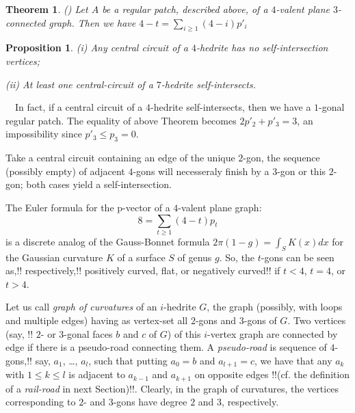 \documentclass[12pt]{article}
\newtheorem{proposition}{Proposition}
\newtheorem{theorem}{Theorem}
\newcommand{\proof}{\noindent{\bf Proof.}\ \ }
\begin{document}
\begin{theorem} \label{Local-Euler-Formula}(\cite{DSt})
Let $A$ be a regular patch, described above, of a $4$-valent plane
$3$-connected graph. Then we have $4-t=\sum_{i\geq 1} (4-i)p'_i$
\end{theorem}



\begin{proposition}
(i) Any central circuit of a $4$-hedrite has no self-intersection vertices;

(ii) At least one central-circuit of a $7$-hedrite self-intersects.
\end{proposition}
\proof In fact, if a central circuit of a $4$-hedrite self-intersects, then we have a $1$-gonal regular patch. The equality of above Theorem becomes $2p'_2+p'_3=3$, an impossibility since $p'_3\leq p_3=0$.

Take a central circuit containing an edge of the unique $2$-gon, the sequence (possibly empty) of adjacent $4$-gons will necesseraly finish by a $3$-gon or this $2$-gon; both cases yield a self-intersection.






The Euler formula for the p-vector of a $4$-valent plane graph:
$$8=\sum_{t\geq 1} (4-t)p_t$$
is a discrete analog of the Gauss-Bonnet formula $2\pi(1-g)=\int_{S} K(x)dx$ for the Gaussian curvature $K$ of a surface $S$ of genus $g$. So, the $t$-gons can be seen as,!! respectively,!! positively curved, flat, or negatively 
curved!! if $t<4$, $t=4$, or $t>4$.


Let us call {\em graph of curvatures} of an $i$-hedrite $G$, the
graph (possibly, with loops and multiple edges) having as vertex-set
all $2$-gons and $3$-gons of $G$. 
Two vertices (say, !! $2$- or $3$-gonal faces $b$ and $c$ of $G$) of 
this $i$-vertex graph are connected by edge if there is a pseudo-road 
connecting them. A {\em pseudo-road} is sequence of $4$-gons,!! say, $a_1$, \dots, $a_l$, such that putting $a_0=b$ and $a_{l+1}=c$, 
we have that any $a_k$ with $1\leq k\leq l$ is adjacent to $a_{k-1}$ 
and $a_{k+1}$ on opposite edges !!(cf. the definition of
a {\em rail-road} in next Section)!!. 
Clearly, in the graph of curvatures, 
the vertices corresponding to $2$- and $3$-gons have degree $2$ and $3$, 
respectively.
\end{document}
